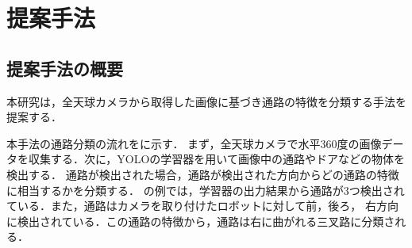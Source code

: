 \documentclass[../main]{subfiles}
\newcommand*\circled[1]{\tikz[baseline=(char.base)]{
            \node[shape=circle,draw,inner sep=1pt] (char) {#1};}}
\begin{document}
    \setcounter{secnumdepth}{2}
    \chapter{提案手法}
        \section{提案手法の概要}
        本研究は，全天球カメラから取得した画像に基づき通路の特徴を分類する手法を提案する．
       

        本手法の通路分類の流れをに示す．
        まず，全天球カメラで水平360度の画像データを収集する．次に，YOLOの学習器を用いて画像中の通路やドアなどの物体を検出する．
        通路が検出された場合，通路が検出された方向からどの通路の特徴に相当するかを分類する．
        の例では，学習器の出力結果から通路が3つ検出されている．また，通路はカメラを取り付けたロボットに対して前，後ろ，
        右方向に検出されている．この通路の特徴から，通路は右に曲がれる三叉路に分類される．
        
\end{document}
